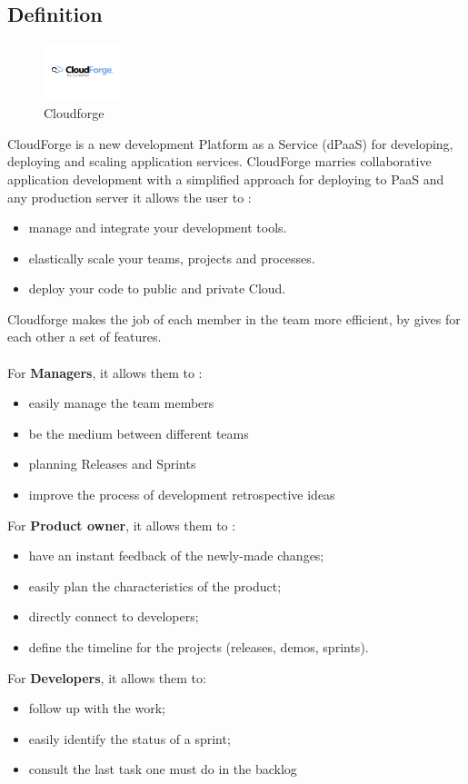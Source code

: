 \subsection{Definition}   
\begin{figure}[h]
	\centering
	\includegraphics[width=0.2\textwidth]{logocloudforge.png}
	\caption{Cloudforge}
\end{figure}
CloudForge is a new development Platform as a Service (dPaaS) for developing, deploying and scaling application services. CloudForge marries collaborative application development with a simplified approach for deploying to PaaS and any production server \cite{ref13} it allows the user to :
 
 \begin{itemize}
 	\item manage and integrate your development tools.
 	\item elastically scale your teams, projects and processes.
 	\item deploy your code to public and private Cloud.
 \end{itemize}
Cloudforge makes the job of each member in the team more efficient, by gives for each other a set of features.
\\
\\
For \textbf{Managers}, it allows them to : 
\begin{itemize}
	\item easily manage the team members
	\item be the medium between different teams
	\item planning Releases and Sprints
	\item improve the process of development retrospective ideas
\end{itemize} 
For \textbf{Product owner}, it allows them to :
\begin{itemize}
	\item have an instant feedback of the newly-made changes;
	\item easily plan the characteristics of the product;
	\item directly connect to developers;
    \item  define the timeline for the projects (releases, demos, sprints).
\end{itemize}
For \textbf{Developers}, it allows them to:
\begin{itemize}
	\item follow up with the work;
	\item easily identify the status of a sprint;
	\item consult the last task one must do in the backlog
\end{itemize}


